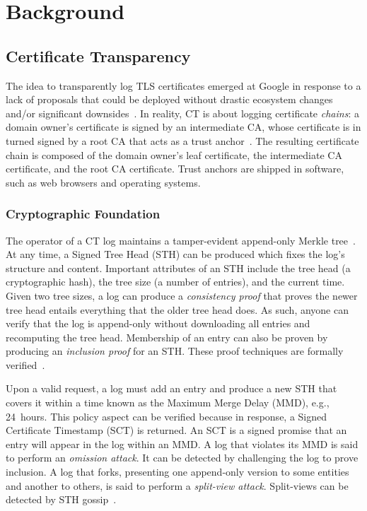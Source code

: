 \section{Background} \label{sec:background}

\subsection{Certificate Transparency} \label{sec:background:ct}
The idea to transparently log TLS certificates emerged at Google in response to
a lack of proposals that could be deployed without drastic ecosystem changes
and/or significant downsides~\cite{ct/a}.  In reality, CT is about logging
certificate \emph{chains}:
	a domain owner's certificate is signed by an intermediate CA, whose
	certificate is in turned signed by a root CA that acts as a trust
	anchor~\cite{ca-ecosystem}.
The resulting certificate chain is composed of the domain owner's leaf
certificate, the intermediate CA certificate, and the root CA certificate.
Trust anchors are shipped in software, such as web browsers and operating
systems.

\subsubsection{Cryptographic Foundation}
The operator of a CT log maintains a tamper-evident append-only Merkle
tree~\cite{ct,ct/bis}.  At any time, a Signed Tree Head (STH) can be produced
which fixes the log's structure and content.  Important attributes of an STH
include
	the tree head (a cryptographic hash),
	the tree size (a number of entries), and
	the current time.
Given two tree sizes, a log can produce a \emph{consistency proof} that proves
the newer tree head entails everything that the older tree head does.  As such,
anyone can verify that the log is append-only without downloading all entries
and recomputing the tree head.  Membership of an entry can also be proven
by producing an \emph{inclusion proof} for an STH\@.  These proof techniques are
formally verified~\cite{secure-logging-and-ct}.

Upon a valid request, a log must add an entry and produce a new STH that covers
it within a time known as the Maximum Merge Delay (MMD), e.g., 24~hours.  This
policy aspect can be verified because in response, a Signed Certificate
Timestamp (SCT) is returned.  An SCT is a signed promise that an entry will
appear in the log within an MMD.  A log that violates its MMD is said to perform
an \emph{omission attack}.  It can be detected by challenging the log to prove
inclusion.  A log that forks, presenting one append-only version
to some entities and another to others, is said to perform a \emph{split-view
attack}.  Split-views can be detected by STH
gossip~\cite{chuat,dahlberg,nordberg,syta}.

